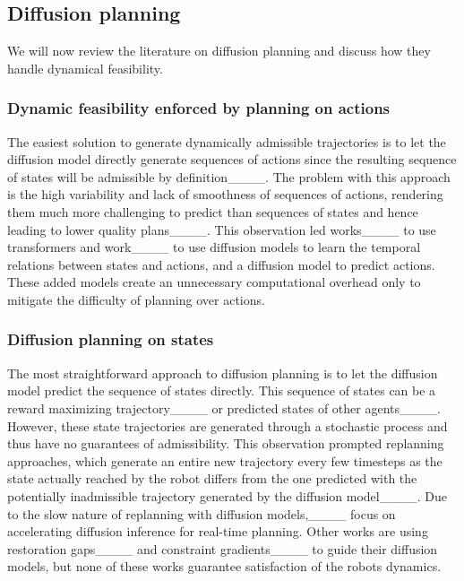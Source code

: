 \subsection{Diffusion planning}\label{subsec: litt planning}

We will now review the literature on diffusion planning and discuss how they handle dynamical feasibility.

\subsubsection{Dynamic feasibility enforced by planning on actions}

The easiest solution to generate dynamically admissible trajectories is to let the diffusion model directly generate sequences of actions since the resulting sequence of states will be admissible by definition____. The problem with this approach is the high variability and lack of smoothness of sequences of actions, rendering them much more challenging to predict than sequences of states and hence leading to lower quality plans____. This observation led works____ to use transformers and work____ to use diffusion models to learn the temporal relations between states and actions, and a diffusion model to predict actions. These added models create an unnecessary computational overhead only to mitigate the difficulty of planning over actions.



\subsubsection{Diffusion planning on states}

The most straightforward approach to diffusion planning is to let the diffusion model predict the sequence of states directly. This sequence of states can be a reward maximizing trajectory____ or predicted states of other agents____. However, these state trajectories are generated through a stochastic process and thus have no guarantees of admissibility. This observation prompted replanning approaches, which generate an entire new trajectory every few timesteps as the state actually reached by the robot differs from the one predicted with the potentially inadmissible trajectory generated by the diffusion model____. Due to the slow nature of replanning with diffusion models,____ focus on accelerating diffusion inference for real-time planning. Other works are using restoration gaps____ and constraint gradients____ to guide their diffusion models, but none of these works guarantee satisfaction of the robots dynamics.

